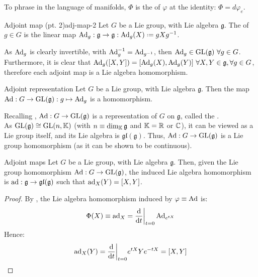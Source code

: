 To phrase  in the language of manifolds, $ \Phi $ is the  of $ \varphi $ at the identity: $ \Phi = d\varphi_e $.

\begin{definition}{Adjoint map (pt. 2)}{adj-map-2}
  Let $ G $ be a Lie group, with Lie algebra $ \mathfrak{g} $. The  of $ g \in G $ is the linear map $ \Ad_g : \mathfrak{g} \rightarrow \mathfrak{g} : \Ad_g(X) \defeq g X g^{-1} $.
\end{definition}

As $ \operatorname{Ad}_g $ is clearly invertible, with $ \operatorname{Ad}_g^{-1} = \operatorname{Ad}_{g^{-1}} $, then $ \operatorname{Ad}_g \in \mathrm{GL}(\mathfrak{g}) \,\,\forall g \in G $. Furthermore, it is clear that $ \operatorname{Ad}_g([X,Y]) = [\operatorname{Ad}_g(X),\operatorname{Ad}_g(Y)] \,\,\forall X,Y \in \mathfrak{g} , \forall g \in G $, therefore each adjoint map is a Lie algebra homomorphism.

\begin{proposition}{Adjoint representation}{}
  Let $ G $ be a Lie group, with Lie algebra $ \mathfrak{g} $. Then the map $ \operatorname{Ad} : G \rightarrow \mathrm{GL}(\mathfrak{g}) : g \mapsto \operatorname{Ad}_g $ is a homomorphism.
\end{proposition}

Recalling , $ \operatorname{Ad} : G \rightarrow \mathrm{GL}(\mathfrak{g}) $ is a representation of $ G $ on $ \mathfrak{g} $, called the .\\
As $ \mathrm{GL}(\mathfrak{g}) \cong \mathrm{GL}(n,\mathbb{K}) $ (with $ n \equiv \dim_{\mathbb{K}} \mathfrak{g} $ and $ \mathbb{K} = \mathbb{R} $ or $ \mathbb{C} $), it can be viewed as a Lie group itself, and its Lie algebra is $ \mathfrak{gl}(\mathfrak{g}) $. Thus, $ \operatorname{Ad} : G \rightarrow \mathrm{GL}(\mathfrak{g}) $ is a Lie group homomorphism (as it can be shown to be continuous).

\begin{proposition}{Adjoint maps}{}
  Let $ G $ be a Lie group, with Lie algebra $ \mathfrak{g} $. Then, given the Lie group homomorphism $ \operatorname{Ad} : G \rightarrow \mathrm{GL}(\mathfrak{g}) $, the induced Lie algebra homomorphism is $ \operatorname{ad} : \mathfrak{g} \rightarrow \mathfrak{gl}(\mathfrak{g}) $ such that $ \operatorname{ad}_X(Y) = [X,Y] $.
\end{proposition}

\begin{proofbox}
  \begin{proof}
    By , the Lie algebra homomorphism induced by $ \varphi \equiv \operatorname{Ad} $ is:
    \begin{equation*}
      \Phi(X) \equiv \operatorname{ad}_X = \frac{\mathrm{d}}{\mathrm{d} t}\bigg\vert_{t = 0} \operatorname{Ad}_{e^{tX}}
    \end{equation*}
    Hence:
    \begin{equation*}
      \operatorname{ad}_X(Y) = \frac{\mathrm{d}}{\mathrm{d} t}\bigg\vert_{t = 0} e^{tX} Y e^{-tX} = [X,Y]
    \end{equation*}
  \end{proof}
\end{proofbox}

